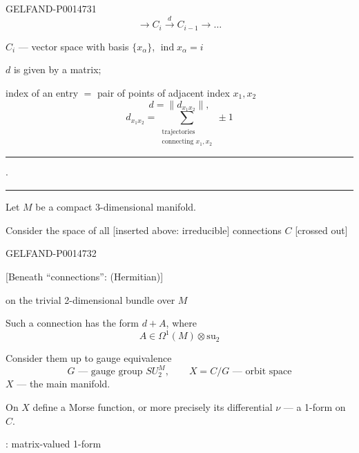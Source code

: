 \begin{GelfandAdjacentEvidence}{GELFAND-P001473}{1}
\begin{equation*}
\longrightarrow C_i\xrightarrow{d}C_{i-1}\longrightarrow\ldots
\tag{3}
\end{equation*}

\(C_i\) — vector space with basis \(\{x_\alpha\}\), \(\operatorname{ind}x_\alpha=i\)

\(d\) is given by a matrix;

index of an entry \(=\) pair of points of adjacent index \(x_1,x_2\)
\[
d=\lVert d_{x_1x_2}\rVert,
\]
\begin{equation*}
d_{x_1x_2}=\sum_{\substack{\text{trajectories}\\\text{connecting }x_1,x_2}}\pm1
\tag{4}
\end{equation*}

\begin{center}
\rule{12mm}{.4pt}\quad\(\cdot\)\quad\rule{12mm}{.4pt}
\end{center}

Let \(M\) be a compact 3-dimensional manifold.

Consider the space of all [inserted above: irreducible] connections \(C\) [crossed out]

\end{GelfandAdjacentEvidence}
\begin{GelfandAdjacentEvidence}{GELFAND-P001473}{2}


[Beneath “connections”: (Hermitian)]

on the trivial 2-dimensional bundle over \(M\)

Such a connection has the form \(d+A\), where
\[
A\in\Omega^1(M)\otimes\mathrm{su}_2
\]
\end{GelfandAdjacentEvidence}


Consider them up to gauge equivalence
\[
G\text{ — gauge group }SU_2^M,\qquad X=C/G\text{ — orbit space}
\]
\(X\) — the main manifold.

On \(X\) define a Morse function, or more precisely its differential
\(\nu\) — a 1-form on \(C\).

: matrix-valued 1-form

